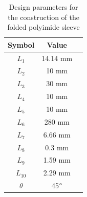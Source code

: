 \begin{table}
\centering
\caption{Design parameters for the construction of the folded polyimide sleeve}
\begin{tabular}{ccc}
    \hline
    \textbf{Symbol} & \textbf{Value}\\
    \hline
    $L_1$ & 14.14 mm \\
    $L_2$ & 10 mm\\
    $L_3$ & 30 mm  \\
    $L_4$ & 10 mm \\
    $L_5$ & 10 mm \\
    $L_6$ & 280 mm \\
    $L_7$ & 6.66 mm \\
    $L_8$ & 0.3 mm \\
    $L_9$ & 1.59 mm \\
    $L_{10}$ & 2.29 mm \\
    $\theta$ & 45$\degree$ \\
    \hline
    
\end{tabular}
    
    \label{tab:design_param}

\end{table}


